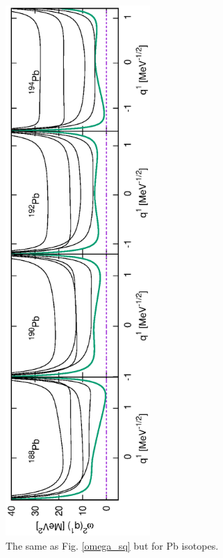 \documentclass[%
superscriptaddress,
showpacs,
nofootinbib,
amsmath,amssymb,
aps,
prc,
twocolumn,
floatfix ]%
{revtex4-1}
\begin{document}



\begin{figure}[tb]
 \begin{center}
  \includegraphics[width=55mm,angle=-90]{Pbomega_sq.eps}
 \end{center}
	\caption{The same as Fig. \ref{omega_sq} but for Pb isotopes.
}
 \label{Pb_omega_sq}
\end{figure}
\end{document}
